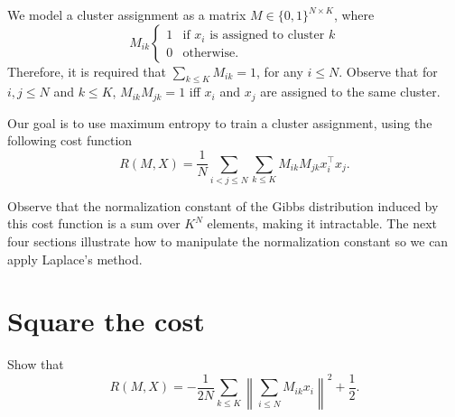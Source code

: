 We model a cluster assignment as a matrix $M \in \{0, 1\}^{N \times K}$, where
%
\begin{equation}
M_{ik} \begin{cases}
1 & \text{if $x_i$ is assigned to cluster $k$}\\
0 & \text{otherwise}.
\end{cases}
\end{equation}
%
Therefore, it is required that $\sum_{k \leq K} M_{ik} = 1$, for any $i \leq N$. Observe that for $i, j \leq N$ and $k \leq K$, $M_{ik}M_{jk} = 1$ iff $x_i$ and $x_j$ are assigned to the same cluster.

Our goal is to use maximum entropy to train a cluster assignment, using the following cost function
%
\begin{equation}
R(M, X) = \frac{1}{N}\sum_{i < j \leq N} \sum_{k \leq K} M_{ik}M_{jk}x_i^\top x_j.
\end{equation}
%

Observe that the normalization constant of the Gibbs distribution induced by this cost function is a sum over $K^N$ elements, making it intractable. The next four sections illustrate how to manipulate the normalization constant so we can apply Laplace's method.

%

\section{Square the cost}
\label{sec:cost_function_la}

\begin{exercise}
Show that
%
\begin{equation}
R(M, X) = -\frac{1}{2N}\sum_{k \leq K}\left\|\sum_{i \leq N} M_{ik}x_i\right\|^2 + \frac{1}{2}.
\end{equation}
\label{ex:cost_fun_quad}
\end{exercise}


